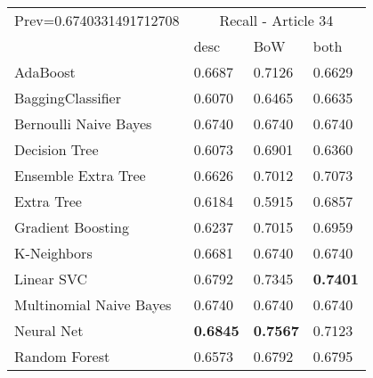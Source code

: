 \begin{tabular}{|l|l|l|l| }
\hline
Prev=0.6740331491712708 &  \multicolumn{3}{c|}{Recall - Article 34} \\
\cline{2-4} & desc & BoW & both \\ \hline
AdaBoost                & 0.6687 & 0.7126 & 0.6629\\
BaggingClassifier       & 0.6070 & 0.6465 & 0.6635\\
Bernoulli Naive Bayes   & 0.6740 & 0.6740 & 0.6740\\
Decision Tree           & 0.6073 & 0.6901 & 0.6360\\
Ensemble Extra Tree     & 0.6626 & 0.7012 & 0.7073\\
Extra Tree              & 0.6184 & 0.5915 & 0.6857\\
Gradient Boosting       & 0.6237 & 0.7015 & 0.6959\\
K-Neighbors             & 0.6681 & 0.6740 & 0.6740\\
Linear SVC              & 0.6792 & 0.7345 & {\bf 0.7401}\\
Multinomial Naive Bayes & 0.6740 & 0.6740 & 0.6740\\
Neural Net              & {\bf 0.6845} & {\bf 0.7567} & 0.7123\\
Random Forest           & 0.6573 & 0.6792 & 0.6795\\
\hline
\end{tabular}